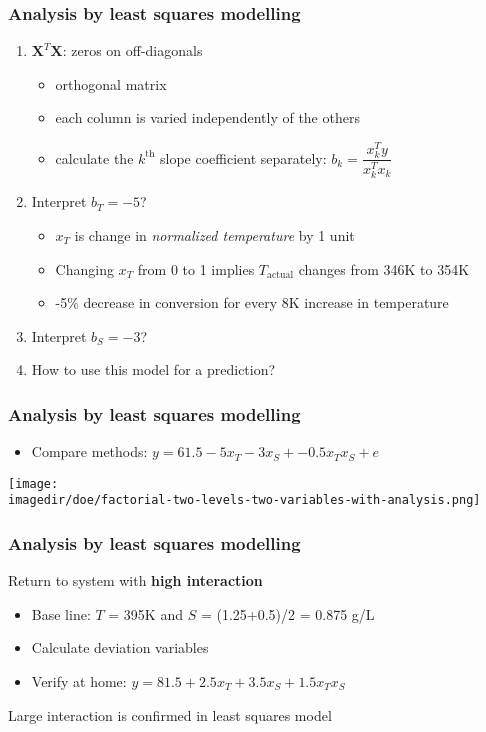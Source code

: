 \begin{frame}\frametitle{Analysis by least squares modelling}
	\begin{enumerate}
		\item	$\mathbf{X}^T\mathbf{X}$: zeros on off-diagonals
		\begin{itemize}
			\item	orthogonal matrix
			\item	each column is varied independently of the others
			\item	calculate the $k^\text{th}$ slope coefficient separately: $b_k = \dfrac{x_k^Ty}{x_k^Tx_k}$
		\end{itemize}
		\item	Interpret $b_T = -5$?
		\begin{itemize}
			\item	$x_T$ is change in \emph{normalized temperature} by 1 unit
			\item	Changing $x_T$ from 0 to 1 implies $T_\text{actual}$ changes from 346K to 354K
			\item	-5\% decrease in conversion for every 8K increase in temperature
		\end{itemize}
		\item	Interpret $b_S = -3$?
		\item	How to use this model for a prediction?
	\end{enumerate}
\end{frame}

\begin{frame}\frametitle{Analysis by least squares modelling}
	\begin{itemize}
		\item	Compare methods: $y = 61.5 - 5 x_T - 3 x_S + - 0.5 x_Tx_S + e$
	\end{itemize}
	\begin{center}
		\texttt{[image: \\imagedir/doe/factorial-two-levels-two-variables-with-analysis.png]}
	\end{center}
\end{frame}

\begin{frame}\frametitle{Analysis by least squares modelling}

	Return to system with \textbf{high interaction}
	\begin{itemize}
		\item	Base line: $T$ = 395K and $S$ = (1.25+0.5)/2 = 0.875 g/L
		\item	Calculate deviation variables
		\item	Verify at home: $y = 81.5 + 2.5 x_T + 3.5 x_S + 1.5 x_T x_S$
	\end{itemize}

	Large interaction is confirmed in least squares model
\end{frame}

